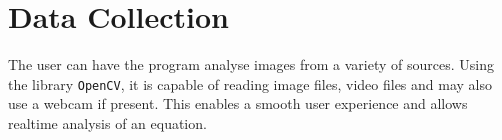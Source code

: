 \documentclass[12pt]{article}
\begin{document}
\section{Data Collection}
The user can have the program analyse images from a variety of sources.
Using the library \texttt{OpenCV}, it is capable of reading image files, video files and may also use a webcam if present.
This enables a smooth user experience and allows realtime analysis of an equation.


\end{document}
